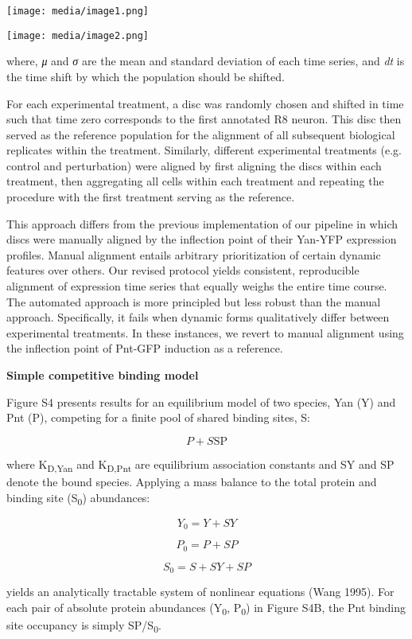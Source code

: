 \texttt{[image: media/image1.png]}

\texttt{[image: media/image2.png]}

where, \emph{μ} and \emph{σ} are the mean and standard deviation of each time series, and \emph{dt} is the time shift by which the population should be shifted.

For each experimental treatment, a disc was randomly chosen and shifted in time such that time zero corresponds to the first annotated R8 neuron. This disc then served as the reference population for the alignment of all subsequent biological replicates within the treatment. Similarly, different experimental treatments (e.g. control and perturbation) were aligned by first aligning the discs within each treatment, then aggregating all cells within each treatment and repeating the procedure with the first treatment serving as the reference.

This approach differs from the previous implementation of our pipeline in which discs were manually aligned by the inflection point of their Yan-YFP expression profiles. Manual alignment entails arbitrary prioritization of certain dynamic features over others. Our revised protocol yields consistent, reproducible alignment of expression time series that equally weighs the entire time course. The automated approach is more principled but less robust than the manual approach. Specifically, it fails when dynamic forms qualitatively differ between experimental treatments. In these instances, we revert to manual alignment using the inflection point of Pnt-GFP induction as a reference.

\textbf{Simple competitive binding model}

Figure S4 presents results for an equilibrium model of two species, Yan (Y) and Pnt (P), competing for a finite pool of shared binding sites, S:

\[P + S\text{SP}\]

where K\textsubscript{D,Yan} and K\textsubscript{D,Pnt} are equilibrium association constants and SY and SP denote the bound species. Applying a mass balance to the total protein and binding site (S\textsubscript{0}) abundances:

\[Y_{0} = Y + SY\]

\[P_{0} = P + SP\]

\[S_{0} = S + SY + SP\]

yields an analytically tractable system of nonlinear equations (Wang 1995). For each pair of absolute protein abundances (Y\textsubscript{0}, P\textsubscript{0}) in Figure S4B, the Pnt binding site occupancy is simply SP/S\textsubscript{0}.


